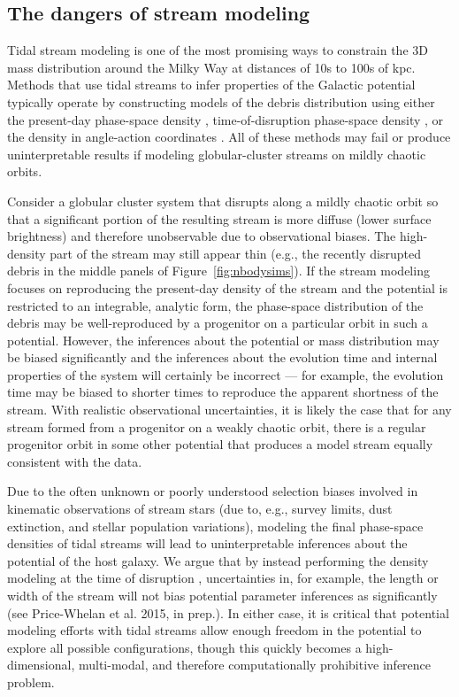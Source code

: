 \documentclass[letterpaper,12pt,preprint]{aastex}
\begin{document}
\subsection{The dangers of stream modeling}

Tidal stream modeling is one of the most promising ways to constrain the 3D mass distribution around the Milky Way at distances of 10s to 100s of kpc. Methods that use tidal streams to infer properties of the Galactic potential typically operate by constructing models of the debris distribution using either the present-day phase-space density \citep[e.g.,][]{kuepper12, kuepper15, amorisco and others}, time-of-disruption phase-space density \citep{apw13, apw14}, or the density in angle-action coordinates \citep{sanders14, bovy14}. All of these methods may fail or produce uninterpretable results if modeling globular-cluster streams on mildly chaotic orbits. 

Consider a globular cluster system that disrupts along a mildly chaotic orbit so that a significant portion of the resulting stream is more diffuse (lower surface brightness) and therefore unobservable due to observational biases. The high-density part of the stream may still appear thin (e.g., the recently disrupted debris in the middle panels of Figure~\ref{fig:nbodysims}). If the stream modeling focuses on reproducing the present-day density of the stream and the potential is restricted to an integrable, analytic form, the phase-space distribution of the debris may be well-reproduced by a progenitor on a particular orbit in such a potential. However, the inferences about the potential or mass distribution may be biased significantly and the inferences about the evolution time and internal properties of the system will certainly be incorrect --- for example, the evolution time may be biased to shorter times to reproduce the apparent shortness of the stream. With realistic observational uncertainties, it is likely the case that for any stream formed from a progenitor on a weakly chaotic orbit, there is a regular progenitor orbit in some other potential that produces a model stream equally consistent with the data. 

Due to the often unknown or poorly understood selection biases involved in kinematic observations of stream stars (due to, e.g., survey limits, dust extinction, and stellar population variations), modeling the final phase-space densities of tidal streams will lead to uninterpretable inferences about the potential of the host galaxy. We argue that by instead performing the density modeling at the time of disruption \citep[e.g.,][]{apw14}, uncertainties in, for example, the length or width of the stream will not bias potential parameter inferences as significantly (see Price-Whelan et al. 2015, in prep.). In either case, it is critical that potential modeling efforts with tidal streams allow enough freedom in the potential to explore all possible configurations, though this quickly becomes a high-dimensional, multi-modal, and therefore computationally prohibitive inference problem. 
\end{document}
